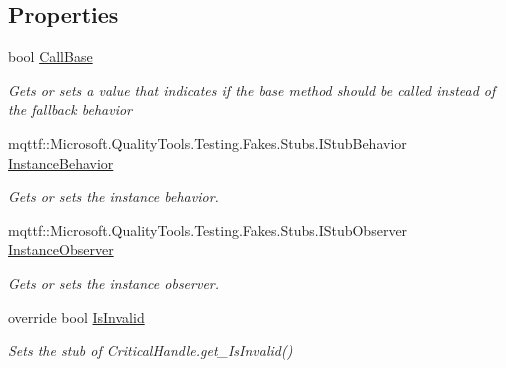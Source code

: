 \subsection*{Properties}
\begin{DoxyCompactItemize}
\item 
bool \hyperlink{class_system_1_1_runtime_1_1_interop_services_1_1_fakes_1_1_stub_critical_handle_aa9a0b569c6292ff13e217b0a3a24e45d}{Call\-Base}
\begin{DoxyCompactList}\small\item\em Gets or sets a value that indicates if the base method should be called instead of the fallback behavior\end{DoxyCompactList}\item 
mqttf\-::\-Microsoft.\-Quality\-Tools.\-Testing.\-Fakes.\-Stubs.\-I\-Stub\-Behavior \hyperlink{class_system_1_1_runtime_1_1_interop_services_1_1_fakes_1_1_stub_critical_handle_a325270aeb3ef22f82248a74887183fef}{Instance\-Behavior}
\begin{DoxyCompactList}\small\item\em Gets or sets the instance behavior.\end{DoxyCompactList}\item 
mqttf\-::\-Microsoft.\-Quality\-Tools.\-Testing.\-Fakes.\-Stubs.\-I\-Stub\-Observer \hyperlink{class_system_1_1_runtime_1_1_interop_services_1_1_fakes_1_1_stub_critical_handle_a639ad15f9567ddcacb46c233feff41a6}{Instance\-Observer}
\begin{DoxyCompactList}\small\item\em Gets or sets the instance observer.\end{DoxyCompactList}\item 
override bool \hyperlink{class_system_1_1_runtime_1_1_interop_services_1_1_fakes_1_1_stub_critical_handle_abd4e97a71ab3d8a58895b26a4f92f7a2}{Is\-Invalid}
\begin{DoxyCompactList}\small\item\em Sets the stub of Critical\-Handle.\-get\-\_\-\-Is\-Invalid()\end{DoxyCompactList}\end{DoxyCompactItemize}


